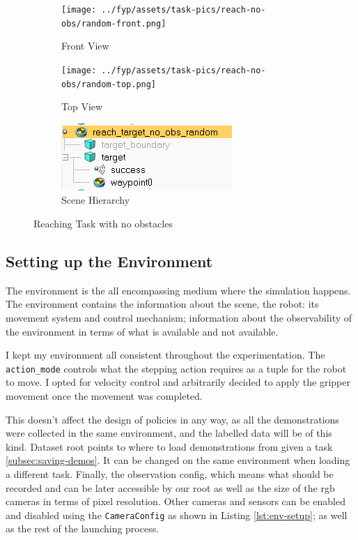 \begin{figure}[htbp]
  \begin{subfigure}{0.48\linewidth}
    \centering
    \texttt{[image: ../fyp/assets/task-pics/reach-no-obs/random-front.png]}      
    \caption{Front View}
  \end{subfigure}%
  \hfill
  \begin{subfigure}{0.48\linewidth}
    \centering
    \texttt{[image: ../fyp/assets/task-pics/reach-no-obs/random-top.png]}
    \caption{Top View}
  \end{subfigure}
  \vspace{0.5em}
  \begin{subfigure}{1\linewidth}
    \centering
    \includegraphics[scale=0.5]{assets/early-work/random-scene-hierarchy.png}
    \caption{Scene Hierarchy}\label{fig:reach-no-obs-hierarchy}
  \end{subfigure}%
  \caption{Reaching Task with no obstacles}\label{fig:reach-no-obs}
\end{figure}

\subsection{Setting up the Environment}
The environment is the all encompassing medium where the simulation happens. The environment contains the information about the scene, the robot: its movement system and control mechanism; information about the observability of the environment in terms of what is available and not available.

I kept my environment all consistent throughout the experimentation. The \verb|action_mode| controls what the stepping action requires as a tuple for the robot to move. I opted for velocity control and arbitrarily decided to apply the gripper movement once the movement was completed. 

This doesn't affect the design of policies in any way, as all the demonstrations were collected in the same environment, and the labelled data will be of this kind. Dataset root points to where to load demonstrations from given a task \ref{subsec:saving-demos}. It can be changed on the same environment when loading a different task. Finally, the observation config, which means what should be recorded and can be later accessible by our root as well as the size of the rgb cameras in terms of pixel resolution. Other cameras and sensors can be enabled and disabled using the \verb|CameraConfig| as shown in Listing \ref{lst:env-setup}; as well as the rest of the launching process.


